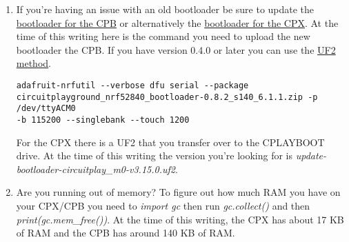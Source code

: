 \begin{enumerate}[itemsep=-5pt]
  \item If you're having an issue with an old bootloader be sure to update the \href{https://learn.adafruit.com/adafruit-circuit-playground-bluefruit/update-bootloader-use-command-line}{bootloader for the CPB} or alternatively the \href{https://learn.adafruit.com/adafruit-circuit-playground-express/updating-the-bootloader}{bootloader for the CPX}. At the time of this writing here is the command you need to upload the new bootloader the CPB. If you have version 0.4.0 or later you can use the \href{https://learn.adafruit.com/adafruit-circuit-playground-bluefruit/update-bootloader-use-uf2}{UF2 method}. 
  \begin{verbatim}adafruit-nrfutil --verbose dfu serial --package 
circuitplayground_nrf52840_bootloader-0.8.2_s140_6.1.1.zip -p /dev/ttyACM0 
-b 115200 --singlebank --touch 1200\end{verbatim}
  For the CPX there is a UF2 that you transfer over to the CPLAYBOOT drive. At the time of this writing the version you're looking for is {\it update-bootloader-circuitplay\_m0-v3.15.0.uf2}.
  \item Are you running out of memory? To figure out how much RAM you have on your CPX/CPB you need to {\it import gc} then run {\it gc.collect()} and then {\it print(gc.mem\_free())}. At the time of this writing, the CPX has about 17 KB of RAM and the CPB has around 140 KB of RAM. 

\end{enumerate}
